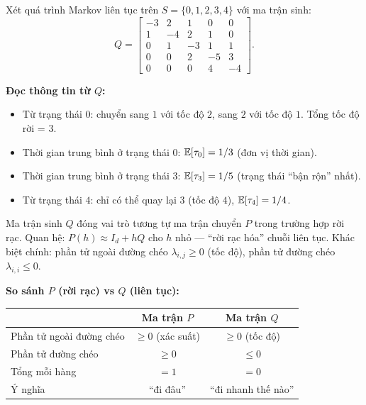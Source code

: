 \begin{example}
\label{ex:5state-generator}
Xét quá trình Markov liên tục trên $S = \{0, 1, 2, 3, 4\}$ với ma trận sinh:
\[
  Q = \begin{bmatrix}
    -3 & 2 & 1 & 0 & 0 \\
    1 & -4 & 2 & 1 & 0 \\
    0 & 1 & -3 & 1 & 1 \\
    0 & 0 & 2 & -5 & 3 \\
    0 & 0 & 0 & 4 & -4
  \end{bmatrix}.
\]

\textbf{Đọc thông tin từ $Q$:}
\begin{itemize}[nosep]
  \item Từ trạng thái $0$: chuyển sang $1$ với tốc độ $2$, sang $2$ với tốc độ $1$. Tổng tốc độ rời = $3$.
  \item Thời gian trung bình ở trạng thái $0$: $\mathbb{E}[\tau_0] = 1/3$ (đơn vị thời gian).
  \item Thời gian trung bình ở trạng thái $3$: $\mathbb{E}[\tau_3] = 1/5$ (trạng thái ``bận rộn'' nhất).
  \item Từ trạng thái $4$: chỉ có thể quay lại $3$ (tốc độ $4$), $\mathbb{E}[\tau_4] = 1/4$.
\end{itemize}
\end{example}

\begin{tomtat}
Ma trận sinh $Q$ đóng vai trò tương tự ma trận chuyển $P$ trong trường hợp rời rạc.
Quan hệ: $P(h) \approx I_d + hQ$ cho $h$ nhỏ --- ``rời rạc hóa'' chuỗi liên tục.
Khác biệt chính: phần tử ngoài đường chéo $\lambda_{i,j} \geq 0$ (tốc độ), phần tử đường chéo $\lambda_{i,i} \leq 0$.

\medskip
\textbf{So sánh $P$ (rời rạc) vs $Q$ (liên tục):}
\begin{center}
\renewcommand{\arraystretch}{1.3}
\begin{tabular}{lcc}
\hline
 & \textbf{Ma trận $P$} & \textbf{Ma trận $Q$} \\
\hline
Phần tử ngoài đường chéo & $\geq 0$ (xác suất) & $\geq 0$ (tốc độ) \\
Phần tử đường chéo & $\geq 0$ & $\leq 0$ \\
Tổng mỗi hàng & $= 1$ & $= 0$ \\
Ý nghĩa & ``đi đâu'' & ``đi nhanh thế nào'' \\
\hline
\end{tabular}
\end{center}
\end{tomtat}

